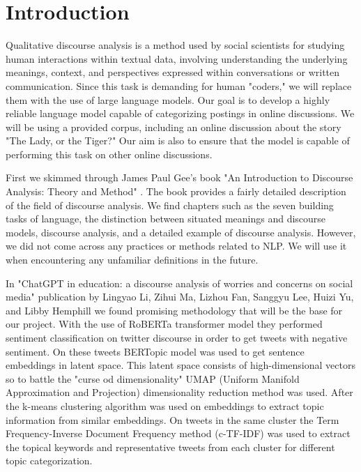 \documentclass[fleqn,moreauthors,10pt]{ds_report}
\affiliation{\textit{Advisors: Slavko Žitnik}}
\begin{document}
\flushbottom 

\maketitle 

\thispagestyle{empty} 


\section*{Introduction}
    
    Qualitative discourse analysis is a method used by social scientists for studying human interactions within textual data, involving understanding the underlying meanings, context, and perspectives expressed within conversations or written communication. Since this task is demanding for human "coders," we will replace them with the use of large language models. Our goal is to develop a highly reliable language model capable of categorizing postings in online discussions. We will be using a provided corpus, including an online discussion about the story "The Lady, or the Tiger?" Our aim is also to ensure that the model is capable of performing this task on other online discussions. 
    
    First we skimmed through James Paul Gee's book "An Introduction to Discourse Analysis: Theory and Method" \cite{gee2014introduction}. The book provides a fairly detailed description of the field of discourse analysis. We find chapters such as the seven building tasks of language, the distinction between situated meanings and discourse models, discourse analysis, and a detailed example of discourse analysis. However, we did not come across any practices or methods related to NLP. We will use it when encountering any unfamiliar definitions in the future. 
    
    In "ChatGPT in education: a discourse analysis of worries and concerns on social media" publication by Lingyao Li, Zihui Ma, Lizhou Fan, Sanggyu Lee, Huizi Yu, and Libby Hemphill \cite{li2305chatgpt} we found promising methodology that will be the base for our project. With the use of RoBERTa transformer model they performed sentiment classification on twitter discourse in order to get tweets with negative sentiment. On these tweets BERTopic model was used to get sentence embeddings in latent space. This latent space consists of high-dimensional vectors so to battle the "curse od dimensionality" UMAP (Uniform Manifold Approximation and Projection) dimensionality reduction method was used. After the k-means clustering algorithm was used on embeddings to extract topic information from similar embeddings. On tweets in the same cluster the Term Frequency-Inverse Document Frequency method (c-TF-IDF) was used to extract the topical keywords and representative tweets from each cluster for different topic categorization. 
    
\end{document}
